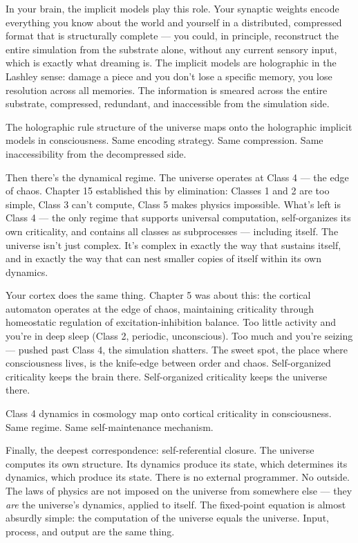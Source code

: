 \documentclass[11pt, twoside, openright]{book}
\begin{document}
In your brain, the implicit models play this role. Your synaptic weights encode everything you know about the world and yourself in a distributed, compressed format that is structurally complete --- you could, in principle, reconstruct the entire simulation from the substrate alone, without any current sensory input, which is exactly what dreaming is. The implicit models are holographic in the Lashley sense: damage a piece and you don't lose a specific memory, you lose resolution across all memories. The information is smeared across the entire substrate, compressed, redundant, and inaccessible from the simulation side.

The holographic rule structure of the universe maps onto the holographic implicit models in consciousness. Same encoding strategy. Same compression. Same inaccessibility from the decompressed side.

Then there's the dynamical regime. The universe operates at Class 4 --- the edge of chaos. Chapter 15 established this by elimination: Classes 1 and 2 are too simple, Class 3 can't compute, Class 5 makes physics impossible. What's left is Class 4 --- the only regime that supports universal computation, self-organizes its own criticality, and contains all classes as subprocesses --- including itself. The universe isn't just complex. It's complex in exactly the way that sustains itself, and in exactly the way that can nest smaller copies of itself within its own dynamics.

Your cortex does the same thing. Chapter 5 was about this: the cortical automaton operates at the edge of chaos, maintaining criticality through homeostatic regulation of excitation-inhibition balance. Too little activity and you're in deep sleep (Class 2, periodic, unconscious). Too much and you're seizing --- pushed past Class 4, the simulation shatters. The sweet spot, the place where consciousness lives, is the knife-edge between order and chaos. Self-organized criticality keeps the brain there. Self-organized criticality keeps the universe there.

Class 4 dynamics in cosmology map onto cortical criticality in consciousness. Same regime. Same self-maintenance mechanism.

Finally, the deepest correspondence: self-referential closure. The universe computes its own structure. Its dynamics produce its state, which determines its dynamics, which produce its state. There is no external programmer. No outside. The laws of physics are not imposed on the universe from somewhere else --- they \textit{are} the universe's dynamics, applied to itself. The fixed-point equation is almost absurdly simple: the computation of the universe equals the universe. Input, process, and output are the same thing.
\end{document}
